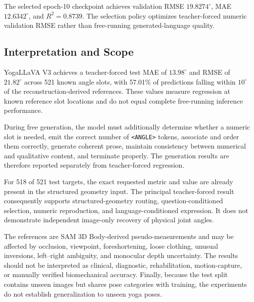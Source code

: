 The selected epoch-10 checkpoint achieves validation RMSE
$19.8274^\circ$, MAE $12.6342^\circ$, and $R^2=0.8739$. The selection
policy optimizes teacher-forced numeric validation RMSE rather than
free-running generated-language quality.

\subsection{Interpretation and Scope}
\label{sec:result_interpretation}

YogaLLaVA V3 achieves a teacher-forced test MAE of $13.98^\circ$ and
RMSE of $21.82^\circ$ across 521 known angle slots, with 57.01\% of
predictions falling within $10^\circ$ of the reconstruction-derived
references. These values measure regression at known reference slot
locations and do not equal complete free-running inference performance.

During free generation, the model must additionally determine whether a
numeric slot is needed, emit the correct number of
\texttt{<ANGLE>} tokens, associate and order them correctly, generate
coherent prose, maintain consistency between numerical and qualitative
content, and terminate properly. The generation results are therefore
reported separately from teacher-forced regression.

For 518 of 521 test targets, the exact requested metric and value are
already present in the structured geometry input. The principal
teacher-forced result consequently supports structured-geometry routing,
question-conditioned selection, numeric reproduction, and
language-conditioned expression. It does not demonstrate independent
image-only recovery of physical joint angles.

The references are SAM 3D Body-derived pseudo-measurements and may be
affected by occlusion, viewpoint, foreshortening, loose clothing,
unusual inversions, left--right ambiguity, and monocular depth
uncertainty. The results should not be interpreted as clinical,
diagnostic, rehabilitation, motion-capture, or manually verified
biomechanical accuracy. Finally, because the test split contains unseen
images but shares pose categories with training, the experiments do not
establish generalization to unseen yoga poses.
